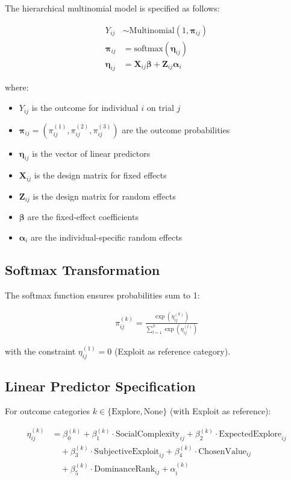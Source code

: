 \documentclass[11pt,a4paper]{article}
\begin{document}
The hierarchical multinomial model is specified as follows:

\begin{align}
Y_{ij} &\sim \text{Multinomial}(1, \boldsymbol{\pi}_{ij}) \\
\boldsymbol{\pi}_{ij} &= \text{softmax}(\boldsymbol{\eta}_{ij}) \\
\boldsymbol{\eta}_{ij} &= \boldsymbol{X}_{ij}\boldsymbol{\beta} + \boldsymbol{Z}_{ij}\boldsymbol{\alpha}_i
\end{align}

where:
\begin{itemize}
\item $Y_{ij}$ is the outcome for individual $i$ on trial $j$
\item $\boldsymbol{\pi}_{ij} = (\pi_{ij}^{(1)}, \pi_{ij}^{(2)}, \pi_{ij}^{(3)})$ are the outcome probabilities
\item $\boldsymbol{\eta}_{ij}$ is the vector of linear predictors
\item $\boldsymbol{X}_{ij}$ is the design matrix for fixed effects
\item $\boldsymbol{Z}_{ij}$ is the design matrix for random effects
\item $\boldsymbol{\beta}$ are the fixed-effect coefficients
\item $\boldsymbol{\alpha}_i$ are the individual-specific random effects
\end{itemize}

\subsection{Softmax Transformation}

The softmax function ensures probabilities sum to 1:

\begin{align}
\pi_{ij}^{(k)} = \frac{\exp(\eta_{ij}^{(k)})}{\sum_{l=1}^{3} \exp(\eta_{ij}^{(l)})}
\end{align}

with the constraint $\eta_{ij}^{(1)} = 0$ (Exploit as reference category).

\subsection{Linear Predictor Specification}

For outcome categories $k \in \{\text{Explore}, \text{None}\}$ (with Exploit as reference):

\begin{align}
\eta_{ij}^{(k)} &= \beta_0^{(k)} + \beta_1^{(k)} \cdot \text{SocialComplexity}_{ij} + \beta_2^{(k)} \cdot \text{ExpectedExplore}_{ij} \\
&\quad + \beta_3^{(k)} \cdot \text{SubjectiveExploit}_{ij} + \beta_4^{(k)} \cdot \text{ChosenValue}_{ij} \\
&\quad + \beta_5^{(k)} \cdot \text{DominanceRank}_{ij} + \alpha_i^{(k)}
\end{align}
\end{document}

